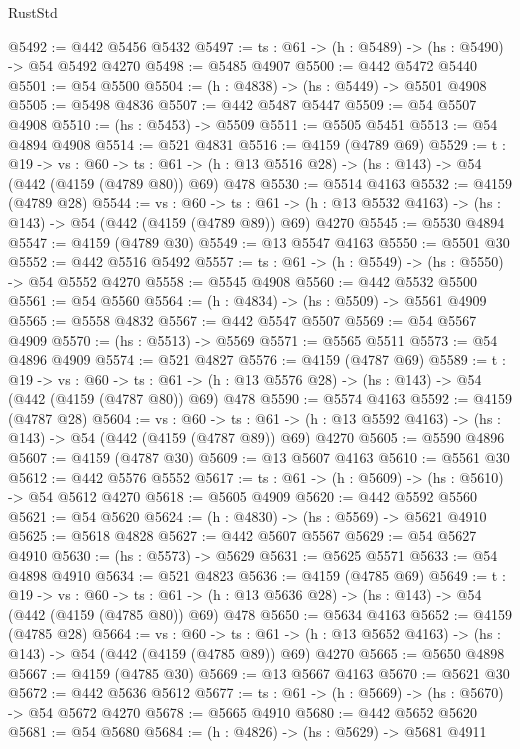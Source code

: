 \begin{lexlean}{RustStd}
\begin{coremodule}
@5492 := @442 @5456 @5432
@5497 := {ts : @61} -> (h : @5489) -> (hs : @5490) -> @54 @5492 @4270
@5498 := @5485 @4907
@5500 := @442 @5472 @5440
@5501 := @54 @5500
@5504 := (h : @4838) -> (hs : @5449) -> @5501 @4908
@5505 := @5498 @4836
@5507 := @442 @5487 @5447
@5509 := @54 @5507 @4908
@5510 := (hs : @5453) -> @5509
@5511 := @5505 @5451
@5513 := @54 @4894 @4908
@5514 := @521 @4831
@5516 := @4159 (@4789 @69)
@5529 := {t : @19} ->
  {vs : @60} ->
  {ts : @61} -> (h : @13 @5516 @28) -> (hs : @143) -> @54 (@442 (@4159 (@4789 @80)) @69) @478
@5530 := @5514 @4163
@5532 := @4159 (@4789 @28)
@5544 := {vs : @60} ->
  {ts : @61} -> (h : @13 @5532 @4163) -> (hs : @143) -> @54 (@442 (@4159 (@4789 @89)) @69) @4270
@5545 := @5530 @4894
@5547 := @4159 (@4789 @30)
@5549 := @13 @5547 @4163
@5550 := @5501 @30
@5552 := @442 @5516 @5492
@5557 := {ts : @61} -> (h : @5549) -> (hs : @5550) -> @54 @5552 @4270
@5558 := @5545 @4908
@5560 := @442 @5532 @5500
@5561 := @54 @5560
@5564 := (h : @4834) -> (hs : @5509) -> @5561 @4909
@5565 := @5558 @4832
@5567 := @442 @5547 @5507
@5569 := @54 @5567 @4909
@5570 := (hs : @5513) -> @5569
@5571 := @5565 @5511
@5573 := @54 @4896 @4909
@5574 := @521 @4827
@5576 := @4159 (@4787 @69)
@5589 := {t : @19} ->
  {vs : @60} ->
  {ts : @61} -> (h : @13 @5576 @28) -> (hs : @143) -> @54 (@442 (@4159 (@4787 @80)) @69) @478
@5590 := @5574 @4163
@5592 := @4159 (@4787 @28)
@5604 := {vs : @60} ->
  {ts : @61} -> (h : @13 @5592 @4163) -> (hs : @143) -> @54 (@442 (@4159 (@4787 @89)) @69) @4270
@5605 := @5590 @4896
@5607 := @4159 (@4787 @30)
@5609 := @13 @5607 @4163
@5610 := @5561 @30
@5612 := @442 @5576 @5552
@5617 := {ts : @61} -> (h : @5609) -> (hs : @5610) -> @54 @5612 @4270
@5618 := @5605 @4909
@5620 := @442 @5592 @5560
@5621 := @54 @5620
@5624 := (h : @4830) -> (hs : @5569) -> @5621 @4910
@5625 := @5618 @4828
@5627 := @442 @5607 @5567
@5629 := @54 @5627 @4910
@5630 := (hs : @5573) -> @5629
@5631 := @5625 @5571
@5633 := @54 @4898 @4910
@5634 := @521 @4823
@5636 := @4159 (@4785 @69)
@5649 := {t : @19} ->
  {vs : @60} ->
  {ts : @61} -> (h : @13 @5636 @28) -> (hs : @143) -> @54 (@442 (@4159 (@4785 @80)) @69) @478
@5650 := @5634 @4163
@5652 := @4159 (@4785 @28)
@5664 := {vs : @60} ->
  {ts : @61} -> (h : @13 @5652 @4163) -> (hs : @143) -> @54 (@442 (@4159 (@4785 @89)) @69) @4270
@5665 := @5650 @4898
@5667 := @4159 (@4785 @30)
@5669 := @13 @5667 @4163
@5670 := @5621 @30
@5672 := @442 @5636 @5612
@5677 := {ts : @61} -> (h : @5669) -> (hs : @5670) -> @54 @5672 @4270
@5678 := @5665 @4910
@5680 := @442 @5652 @5620
@5681 := @54 @5680
@5684 := (h : @4826) -> (hs : @5629) -> @5681 @4911

\end{coremodule}
\end{lexlean}
